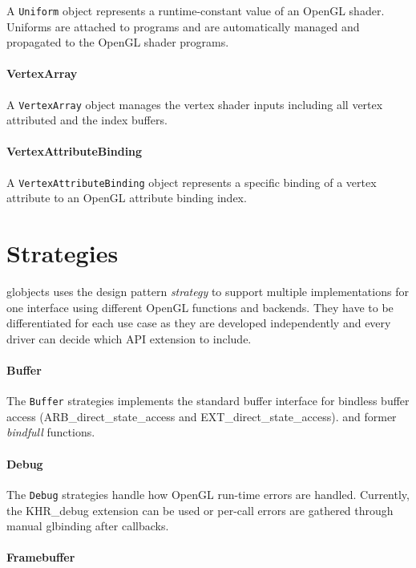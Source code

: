 \documentclass{article}
\begin{document}
A \lstinline|Uniform| object represents a runtime-constant value of an OpenGL shader. Uniforms are attached to programs and are automatically managed and propagated to the OpenGL shader programs.

\paragraph{VertexArray}

A \lstinline|VertexArray| object manages the vertex shader inputs including all vertex attributed and the index buffers.

\paragraph{VertexAttributeBinding}

A \lstinline|VertexAttributeBinding| object represents a specific binding of a vertex attribute to an OpenGL attribute binding index.

\section{Strategies}

globjects uses the design pattern \emph{strategy} to support multiple implementations for one interface using different OpenGL functions and backends. They have to be differentiated for each use case as they are developed independently and every driver can decide which API extension to include.

\paragraph{Buffer}

The \lstinline|Buffer| strategies implements the standard buffer interface for bindless buffer access (ARB\_direct\_state\_access and EXT\_direct\_state\_access). and former \emph{bindfull} functions.

\paragraph{Debug}

The \lstinline|Debug| strategies handle how OpenGL run-time errors are handled. Currently, the KHR\_debug extension can be used or per-call errors are gathered through manual glbinding after callbacks.

\paragraph{Framebuffer}
\end{document}
